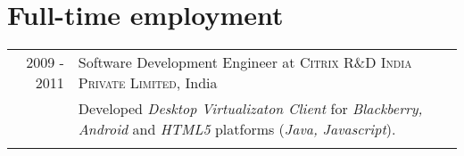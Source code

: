 \documentclass[a4paper,10pt]{article}
\begin{document}

\section {Full-time employment}
\begin{tabular}{r|l}

  \textsc{2009 - 2011} & Software Development Engineer at
                \textsc{Citrix R\&D India Private Limited}, India \\
                       &\footnotesize{Developed   \emph{Desktop Virtualizaton
                 Client}  for
                   \emph{Blackberry, Android}  and \emph{HTML5} platforms
                   (\emph{Java, Javascript}).
                   }\\\multicolumn{2}{c}{} \\  
\end{tabular}
\end{document}
